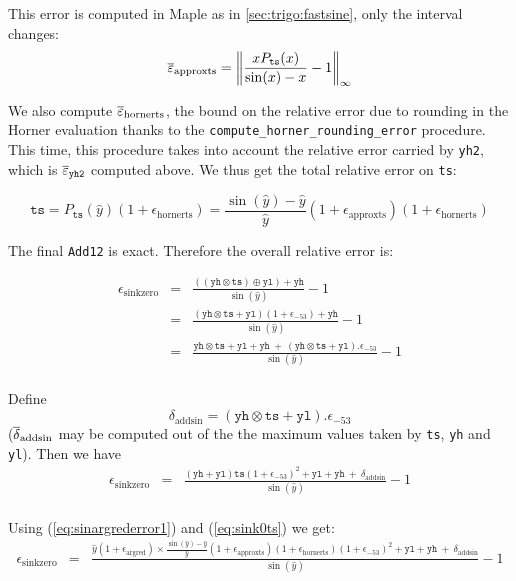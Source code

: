 This error is computed in Maple as in \ref{sec:trigo:fastsine}, only the interval changes:
$${\overline{\varepsilon}}_{\mathrm{approxts}} = \left\Vert \frac{xP_{\mathtt{ts}}(x)}{\sin(x)-x} -1 \right\Vert_{\infty}$$

We also compute ${\overline{\varepsilon}}_{\mathrm{hornerts}}$, the bound on the relative error due
to rounding in the Horner evaluation thanks to the
\texttt{compute\_horner\_rounding\_error} procedure. This time, this procedure 
takes into account the relative error carried by \texttt{yh2}, which is
${\overline{\varepsilon}}_{\mathtt{yh2}}$ computed above.
We thus get the total relative error on \texttt{ts}:

\begin{equation}
  \mathtt{ts} = P_{\mathtt{ts}}(\hat{y})(1+\epsilon_{\mathrm{hornerts}}) = \frac{\sin(\hat{y})-\hat{y}}{\hat{y}}(1+\epsilon_{\mathrm{approxts}})(1+\epsilon_{\mathrm{hornerts}})
  \label{eq:sink0ts}
\end{equation}

The final \texttt{Add12} is exact. Therefore the overall relative error is:

\begin{eqnarray*}
  \epsilon_{\mathrm{sinkzero}} 
  &=& \frac{((\mathtt{yh}\otimes \mathtt{ts}) \oplus \mathtt{yl}) + \mathtt{yh}}{\sin(\hat{y})} -1 \\
  &=& \frac{(\mathtt{yh}\otimes\mathtt{ts} + \mathtt{yl})(1+\epsilon_{-53}) + \mathtt{yh}}{\sin(\hat{y})} -1\\
  &=& \frac{\mathtt{yh}\otimes\mathtt{ts} + \mathtt{yl} + \mathtt{yh}    \ +\  (\mathtt{yh}\otimes\mathtt{ts} + \mathtt{yl}).\epsilon_{-53}}{\sin(\hat{y})} -1\\
\end{eqnarray*}

Define 
\begin{equation}
  \delta_{\mathrm{addsin}} = (\mathtt{yh}\otimes\mathtt{ts} + \mathtt{yl}).\epsilon_{-53}
\label{eq:addsin}
\end{equation}
(${\overline{\delta}}_{\mathrm{addsin}}$ may be computed out of the the maximum
values taken by \texttt{ts}, \texttt{yh} and \texttt{yl}). Then we have
\begin{eqnarray*}
  \epsilon_{\mathrm{sinkzero}} 
  &=& \frac{(\mathtt{yh} + \mathtt{yl})\mathtt{ts}(1+\epsilon_{-53})^2 + \mathtt{yl} + \mathtt{yh}    \ +\  \delta_{\mathrm{addsin}} }{\sin(\hat{y})} -1\\
\end{eqnarray*}

Using (\ref{eq:sinargrederror1}) and (\ref{eq:sink0ts}) we get:
\begin{eqnarray*}
  \epsilon_{\mathrm{sinkzero}} 
  &=& \frac{\hat{y}(1+\epsilon_{\mathrm{argred}})\times\frac{\sin(\hat{y})-\hat{y}}{\hat{y}}(1+\epsilon_{\mathrm{approxts}})(1+\epsilon_{\mathrm{hornerts}})(1+\epsilon_{-53})^2 + \mathtt{yl} + \mathtt{yh}    \ +\  \delta_{\mathrm{addsin}} }{\sin(\hat{y})} -1\\
\end{eqnarray*}

